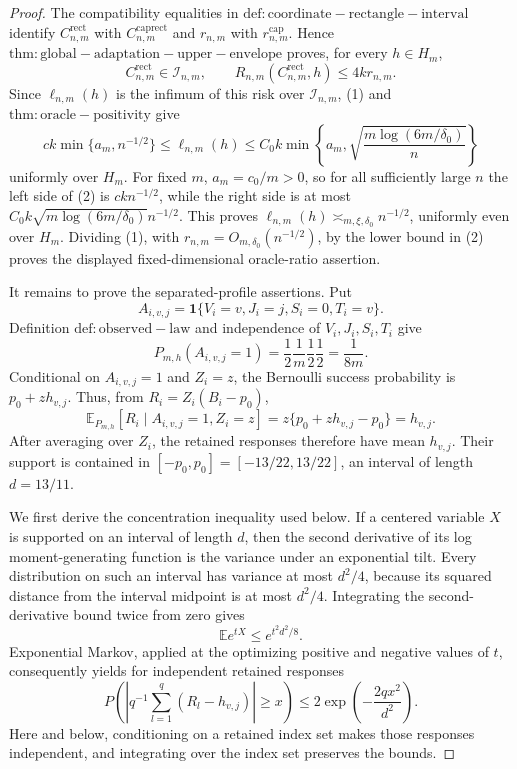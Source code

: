 \documentclass{article}
\begin{document}
\begin{proof}
The compatibility equalities in \(\mathrm{def:coordinate-rectangle-interval}\) identify \(C^{\mathrm{rect}}_{n,m}\) with \(C^{\mathrm{caprect}}_{n,m}\) and \(r_{n,m}\) with \(r^{\mathrm{cap}}_{n,m}\). Hence \(\mathrm{thm:global-adaptation-upper-envelope}\) proves, for every \(h\in H_m\),
\[
 C^{\mathrm{rect}}_{n,m}\in\mathcal I_{n,m},
 \qquad
 R_{n,m}(C^{\mathrm{rect}}_{n,m},h)\leq4kr_{n,m}.                       \tag{1}
\]
Since \(\ell_{n,m}(h)\) is the infimum of this risk over \(\mathcal I_{n,m}\), (1) and \(\mathrm{thm:oracle-positivity}\) give
\[
 ck\min\{a_m,n^{-1/2}\}
 \leq\ell_{n,m}(h)
 \leq C_0k\min\left\{a_m,\sqrt{\frac{m\log(6m/\delta_0)}{n}}\right\} \tag{2}
\]
uniformly over \(H_m\). For fixed \(m\), \(a_m=c_0/m>0\), so for all sufficiently large \(n\) the left side of (2) is \(ckn^{-1/2}\), while the right side is at most \(C_0k\sqrt{m\log(6m/\delta_0)}n^{-1/2}\). This proves \(\ell_{n,m}(h)\asymp_{m,\xi,\delta_0}n^{-1/2}\), uniformly even over \(H_m\). Dividing (1), with \(r_{n,m}=O_{m,\delta_0}(n^{-1/2})\), by the lower bound in (2) proves the displayed fixed-dimensional oracle-ratio assertion.

It remains to prove the separated-profile assertions. Put
\[
 A_{i,v,j}=\mathbf1\{V_i=v,J_i=j,S_i=0,T_i=v\}.
\]
Definition \(\mathrm{def:observed-law}\) and independence of \(V_i,J_i,S_i,T_i\) give
\[
 P_{m,h}(A_{i,v,j}=1)=\frac12\frac1m\frac12\frac12=\frac1{8m}.          \tag{3}
\]
Conditional on \(A_{i,v,j}=1\) and \(Z_i=z\), the Bernoulli success probability is \(p_0+zh_{v,j}\). Thus, from \(R_i=Z_i(B_i-p_0)\),
\[
 \mathbb E_{P_{m,h}}[R_i\mid A_{i,v,j}=1,Z_i=z]
 =z\{p_0+zh_{v,j}-p_0\}=h_{v,j}.                                      \tag{4}
\]
After averaging over \(Z_i\), the retained responses therefore have mean \(h_{v,j}\). Their support is contained in \([-p_0,p_0]=[-13/22,13/22]\), an interval of length \(d=13/11\).

We first derive the concentration inequality used below. If a centered variable \(X\) is supported on an interval of length \(d\), then the second derivative of its log moment-generating function is the variance under an exponential tilt. Every distribution on such an interval has variance at most \(d^2/4\), because its squared distance from the interval midpoint is at most \(d^2/4\). Integrating the second-derivative bound twice from zero gives
\[
 \mathbb E e^{tX}\leq e^{t^2d^2/8}.
\]
Exponential Markov, applied at the optimizing positive and negative values of \(t\), consequently yields for independent retained responses
\[
 P\!\left(\left|q^{-1}\sum_{l=1}^{q}(R_l-h_{v,j})\right|\geq x\right)
 \leq2\exp\left(-\frac{2qx^2}{d^2}\right).                             \tag{5}
\]
Here and below, conditioning on a retained index set makes those responses independent, and integrating over the index set preserves the bounds.


\end{proof}
\end{document}
